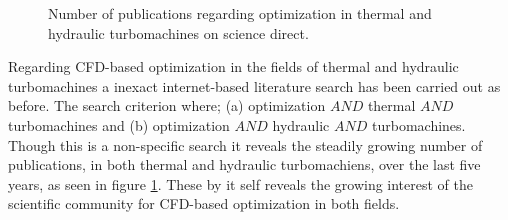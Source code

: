 \begin{figure}[h!]
\begin{minipage}[b]{1\linewidth}
 \centering
\end{minipage}
\caption{Number of publications regarding optimization in thermal and hydraulic turbomachines on science direct.} 
\label{pubs.turbo}
\end{figure}
 

Regarding CFD-based optimization in the fields of thermal and hydraulic turbomachines a inexact internet-based literature search has been carried out as before. The search criterion where; (a) optimization $AND$ thermal $AND$ turbomachines and (b) optimization $AND$ hydraulic $AND$ turbomachines. Though  this is  a non-specific search it reveals the steadily growing number of publications, in both thermal and hydraulic turbomachiens, over the last five years, as seen in figure \ref{pubs.turbo}. These by it self reveals the growing interest of the scientific community for CFD-based optimization in both fields. 

